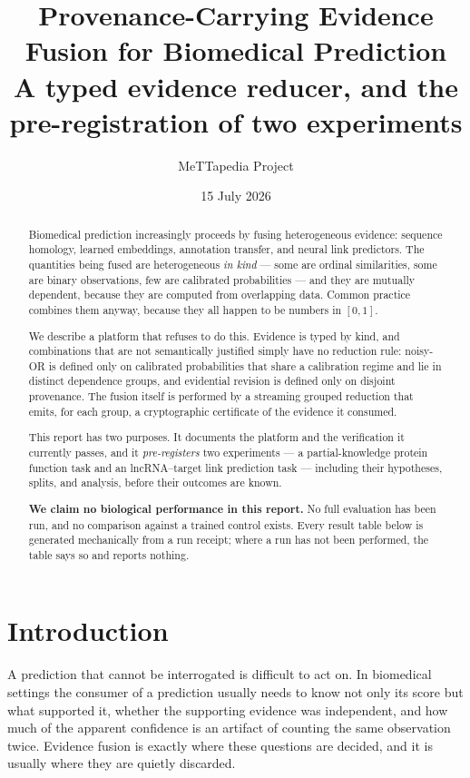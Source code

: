 \documentclass[11pt]{article}
\title{Provenance-Carrying Evidence Fusion for Biomedical Prediction\\
  \large A typed evidence reducer, and the pre-registration of two experiments}
\author{MeTTapedia Project}
\date{15 July 2026}
\begin{document}
\maketitle

\begin{abstract}
Biomedical prediction increasingly proceeds by fusing heterogeneous evidence:
sequence homology, learned embeddings, annotation transfer, and neural link
predictors. The quantities being fused are heterogeneous \emph{in kind} --- some
are ordinal similarities, some are binary observations, few are calibrated
probabilities --- and they are mutually dependent, because they are computed from
overlapping data. Common practice combines them anyway, because they all happen
to be numbers in $[0,1]$.

We describe a platform that refuses to do this. Evidence is typed by kind, and
combinations that are not semantically justified simply have no reduction rule:
noisy-OR is defined only on calibrated probabilities that share a calibration
regime and lie in distinct dependence groups, and evidential revision is defined
only on disjoint provenance. The fusion itself is performed by a streaming
grouped reduction that emits, for each group, a cryptographic certificate of the
evidence it consumed.

This report has two purposes. It documents the platform and the verification it
currently passes, and it \emph{pre-registers} two experiments --- a
partial-knowledge protein function task and an lncRNA--target link prediction
task --- including their hypotheses, splits, and analysis, before their outcomes
are known.

\textbf{We claim no biological performance in this report.} No full evaluation
has been run, and no comparison against a trained control exists. Every result
table below is generated mechanically from a run receipt; where a run has not
been performed, the table says so and reports nothing.
\end{abstract}

\section{Introduction}

A prediction that cannot be interrogated is difficult to act on. In biomedical
settings the consumer of a prediction usually needs to know not only its score
but what supported it, whether the supporting evidence was independent, and how
much of the apparent confidence is an artifact of counting the same observation
twice. Evidence fusion is exactly where these questions are decided, and it is
usually where they are quietly discarded.
\end{document}
